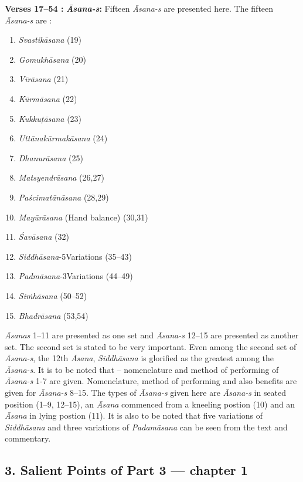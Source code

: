 \textbf{Verses  17--54 :} \textbf{\textit{Āsana-s}:} Fifteen \textit{Āsana-s} are presented here. The fifteen \textit{Āsana-s} are :

\begin{multicols}{2}
\begin{enumerate}
\itemsep=0pt
\item \textit{Svastikāsana} (19)
\item \textit{Gomukhāsana} (20)
\item \textit{Vīrāsana}  (21)
\item \textit{Kūrmāsana} (22)
\item \textit{Kukkuṭāsana} (23)
\item \textit{Uttānakūrmakāsana} (24)
\item \textit{Dhanurāsana} (25)
\item \textit{Matsyendrāsana} (26,27) 
\item \textit{Paścimatānāsana} (28,29)
\item \textit{Mayūrāsana} (Hand balance) (30,31) 
\item \textit{Śavāsana} (32) 
\item \textit{Siddhāsana}-5\hfil\break Variations  (35--43) 
\item \textit{Padmāsana}-3\hfil\break Variations (44--49)
\item \textit{Siṁhāsana} (50--52)   
\item \textit{Bhadrāsana}  (53,54)
\end{enumerate}
\end{multicols}

\textit{Āsanas} 1--11 are presented as one set and \textit{Āsana-s} 12--15 are presented as another set. The second set is stated to be very important. Even among the second set of \textit{Āsana-s}, the 12th \textit{Āsana}, \textit{Siddhāsana} is glorified as the greatest among the \textit{Āsana-s}. It is to be noted that – nomenclature and method of performing of \textit{Āsana-s} 1-7 are given. Nomenclature, method of performing and also benefits are given for \textit{Āsana-s} 8--15.  The types of \textit{Āsana-s} given here are \textit{Āsana-s} in seated position (1--9, 12--15), an \textit{Āsana}  commenced from a kneeling postion (10) and an \textit{Āsana} in lying postion (11). It is also to be noted that five variations of \textit{Siddhāsana} and three variations of \textit{Padamāsana} can be seen from the text and commentary.

\subsection*{3. Salient Points  of Part 3  --- chapter 1}

